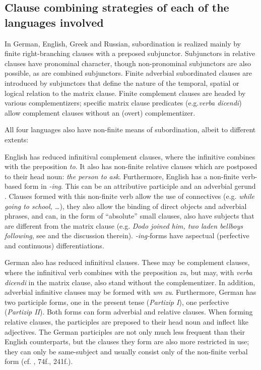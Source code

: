 \documentclass[output=paper,colorlinks,citecolor=brown]{langscibook}
\begin{document}
\subsection{Clause combining strategies of each of the languages involved} \label{sec:schroederetal:1.2}
In German, English, Greek and Russian, subordination is realized mainly by finite right-branching clauses with a preposed subjunctor. Subjunctors in relative clauses have pronominal character, though non-pronominal subjunctors are also possible, as are combined subjunctors. Finite adverbial subordinated clauses are introduced by subjunctors that define the nature of the temporal, spatial or logical relation to the matrix clause. Finite complement clauses are headed by various complementizers; specific matrix clause predicates (e.g.\textit{verba dicendi}) allow complement clauses without an (overt) complementizer. 

All four languages also have non-finite means of subordination, albeit to different extents: 

English has reduced infinitival complement clauses, where the infinitive combines with the preposition \textit{to}. It also has non-finite relative clauses which are postposed to their head noun: \textit{the person to ask}. Furthermore, English has a non-finite verb-based form in \textit{-ing}. This can be an attributive participle and an adverbial gerund \parencite{nedjalkov1995some,kortmann1995adverbial}. Clauses formed with this non-finite verb allow the use of connectives (e.g.\textit{ while going to school, …}), they also allow the binding of direct objects and adverbial phrases, and can, in the form of “absolute” small clauses, also have subjects that are different from the matrix clause (e.g.\textit{ Dodo joined him, two laden bellboys following}, see \textcite [217]{kortmann1995adverbial} and the discussion therein). \textit{-ing-}forms have aspectual (perfective and continuous) differentiations. 

\begin{sloppypar}
German also has reduced infinitival clauses. These may be complement clauses, where the infinitival verb combines with the preposition \textit{zu}, but may, with \textit{verba dicendi} in the matrix clause, also stand without the complementizer. In addition, adverbial infinitive clauses may be formed with  \textit{um zu}. Furthermore, German has two participle forms, one in the present tense (\textit{Partizip I}), one perfective (\textit{Partizip II}). Both forms can form adverbial and relative clauses. When forming relative clauses, the participles are preposed to their head noun and inflect like adjectives. The German participles are not only much less frequent than their English counterparts, but the clauses they form are also more restricted in use; they can only be same-subject and usually consist only of the non-finite verbal form (cf. \cite{book}, 74f., 241f.).
\end{sloppypar}
\end{document}

